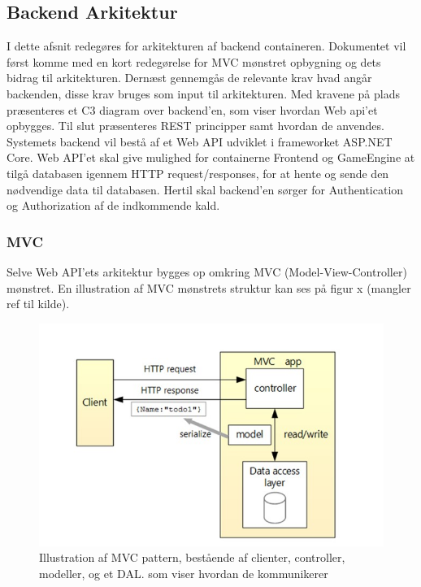 \subsection{Backend Arkitektur}

I dette afsnit redegøres for arkitekturen af backend containeren. Dokumentet vil først komme med en kort redegørelse for MVC mønstret opbygning og dets bidrag til arkitekturen. Dernæst gennemgås de relevante krav hvad angår backenden, disse krav bruges som input til arkitekturen. Med kravene på plads præsenteres et C3 diagram over backend’en, som viser hvordan Web api’et opbygges. Til slut præsenteres REST principper samt hvordan de anvendes.
Systemets backend vil bestå af et Web API udviklet i frameworket ASP.NET Core. Web API’et skal give mulighed for containerne Frontend og GameEngine at tilgå databasen igennem HTTP request/responses, for at hente og sende den nødvendige data til databasen. Hertil skal backend’en sørger for Authentication og Authorization af de indkommende kald.\\

\subsubsection{MVC}
Selve Web API’ets arkitektur bygges op omkring MVC (Model-View-Controller) mønstret. En illustration af MVC mønstrets struktur kan ses på figur x (mangler ref til kilde).

\begin{figure}[h]
\centering
\includegraphics[width = \textwidth]{02-Body/Images/MVC_pattern.JPG}
\caption{Illustration af MVC pattern, bestående af clienter, controller, modeller, og et DAL. som viser hvordan de kommunikerer}
\label{fig:Arkitektur-Backend-MVC}
\end{figure}

